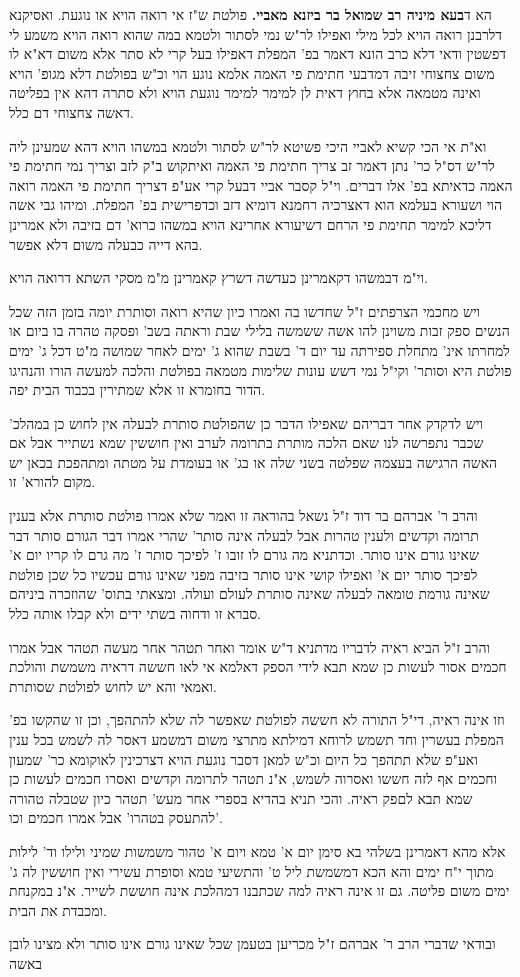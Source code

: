 \documentclass[12pt, openany]{book}
\begin{document}
{{הא ד\textbf{בעא מיניה רב שמואל בר ביזנא מאביי.} פולטת ש"ז אי רואה הויא או נוגעת. ואסיקנא דלרבנן רואה הויא לכל מילי ואפילו לר"ש נמי לסתור ולטמא במה שהוא רואה הויא משמע לי דפשטין ודאי דלא כרב הונא דאמר בפ' המפלת דאפילו בעל קרי לא סתר אלא משום דא"א לו משום צחצוחי זיבה דמדבעי חתימת פי האמה אלמא נוגע הוי וכ"ש בפולטת דלא מגופ' הויא ואינה מטמאה אלא בחוץ דאית לן למימר למימר נוגעת הויא ולא סתרה דהא אין בפליטה דאשה צחצוחי דם כלל.\par וא"ת אי הכי קשיא לאביי היכי פשיטא לר"ש לסתור ולטמא במשהו הויא דהא שמעינן ליה לר"ש דס"ל כר' נתן דאמר זב צריך חתימת פי האמה ואיתקוש ב"ק לזב וצריך נמי חתימת פי האמה כדאיתא בפ' אלו דברים. וי"ל קסבר אביי דבעל קרי אע"פ דצריך חתימת פי האמה רואה הוי ושעורא בעלמא הוא דאצרכיה רחמנא דומיא דזב וכדפרישית בפ' המפלת. ומיהו גבי אשה דליכא למימר תחימת פי הרחם דשיעורא אחרינא הויא במשהו כרוא' דם בזיבה ולא אמרינן בהא דייה כבעלה משום דלא אפשר.\par וי"מ דבמשהו דקאמרינן כעדשה דשרץ קאמרינן מ"מ מסקי השתא דרואה הויא.\par ויש מחכמי הצרפתים ז"ל שחדשו בה ואמרו כיון שהיא רואה וסותרת יומה בזמן הזה שכל הנשים ספק זבות משוינן להו אשה ששמשה בלילי שבת וראתה בשב' ופסקה טהרה בו ביום או למחרתו אינ' מתחלת ספירתה עד יום ד' בשבת שהוא ג' ימים לאחר שמושה מ"ט דכל ג' ימים פולטת היא וסותר' וקי"ל נמי דשש עונות שלימות מטמאה בפולטת והלכה למעשה הורו והנהיגו הדור בחומרא זו אלא שמתירין בכבוד הבית יפה.\par ויש לדקדק אחר דבריהם שאפילו הדבר כן שהפולטת סותרת לבעלה אין לחוש כן במהלכ' שכבר נתפרשה לנו שאם הלכה מותרת בתרומה לערב ואין חוששין שמא נשתייר אבל אם האשה הרגישה בעצמה שפלטה בשני שלה או בג' או בעומדת על מטתה ומתהפכת בכאן יש מקום להורא' זו.\par והרב ר' אברהם בר דוד ז"ל נשאל בהוראה זו ואמר שלא אמרו פולטת סותרת אלא בענין תרומה וקדשים ולענין טהרות אבל לבעלה אינה סותר' שהרי אמרו דבר הגורם סותר דבר שאינו גורם אינו סותר. וכדתניא מה גורם לו זובו ז' לפיכך סותר ז' מה גרם לו קריו יום א' לפיכך סותר יום א' ואפילו קושי אינו סותר בזיבה מפני שאינו גורם עכשיו כל שכן פולטת שאינה גורמת טומאה לבעלה שאינה סותרת לעולם ועולה. ומצאתי בתוס' שהוזכרה ביניהם סברא זו ודחוה בשתי ידים ולא קבלו אותה כלל.\par והרב ז"ל הביא ראיה לדבריו מדתניא ד"ש אומר ואחר תטהר אחר מעשה תטהר אבל אמרו חכמים אסור לעשות כן שמא תבא לידי הספק דאלמא אי לאו חששה דראיה משמשת והולכת ואמאי והא יש לחוש לפולטת שסותרת.\par וזו אינה ראיה, די"ל התורה לא חששה לפולטת שאפשר לה שלא להתהפך, וכן זו שהקשו בפ' המפלת בעשרין וחד תשמש לרוחא דמילתא מתרצי משום דמשמע דאסר לה לשמש בכל ענין ואע"פ שלא תתהפך כל היום וכ"ש למאן דסבר נוגעת הויא דצרכינין לאוקומא כר' שמעון וחכמים אף לזה חששו ואסרוה לשמש, א"נ תטהר לתרומה וקדשים ואסרו חכמים לעשות כן שמא תבא לםפק ראיה. והכי תניא בהדיא בספרי אחר מעש' תטהר כיון שטבלה טהורה להתעסק בטהרו' אבל אמרו חכמים וכו'.\par אלא מהא דאמרינן בשלהי בא סימן יום א' טמא ויום א' טהור משמשות שמיני ולילו וד' לילות מתוך י"ח ימים והא הכא דמשמשת ליל ט' והתשיעי טמא וסופרת עשירי ואין חוששין לה ג' ימים משום פליטה. גם זו אינה ראיה למה שכתבנו דמהלכת אינה חוששת לשייר. א"נ במקנחת ומכבדת את הבית.\par ובודאי שדברי הרב ר' אברהם ז"ל מכריען בטעמן שכל שאינו גורם אינו סותר ולא מצינו לובן באשה }}
\end{document}

